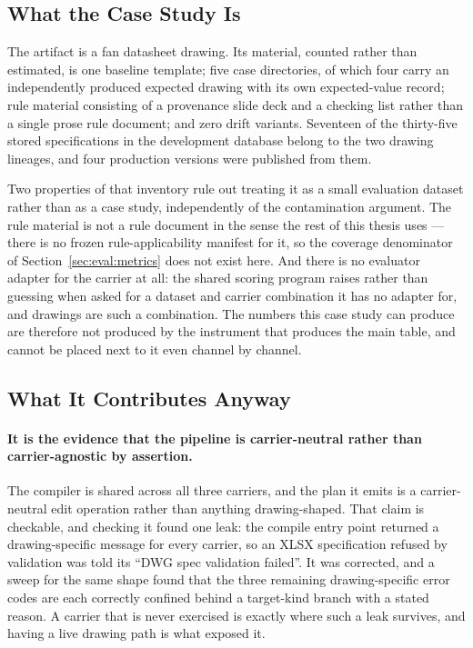 \subsection{What the Case Study Is}

The artifact is a fan datasheet drawing. Its material, counted rather than estimated, is one
baseline template; five case directories, of which four carry an independently produced
expected drawing with its own expected-value record; rule material consisting of a
provenance slide deck and a checking list rather than a single prose rule document; and zero
drift variants. Seventeen of the thirty-five stored specifications in the development database
belong to the two drawing lineages, and four production versions were published from them.

Two properties of that inventory rule out treating it as a small evaluation dataset rather than
as a case study, independently of the contamination argument. The rule material is not a rule
document in the sense the rest of this thesis uses --- there is no frozen rule-applicability
manifest for it, so the coverage denominator of Section~\ref{sec:eval:metrics} does not exist
here. And there is no evaluator adapter for the carrier at all: the shared scoring program
raises rather than guessing when asked for a dataset and carrier combination it has no adapter
for, and drawings are such a combination. The numbers this case study can produce are therefore
not produced by the instrument that produces the main table, and cannot be placed next to it
even channel by channel.

\subsection{What It Contributes Anyway}

\paragraph{It is the evidence that the pipeline is carrier-neutral rather than
carrier-agnostic by assertion.}
The compiler is shared across all three carriers, and the plan it emits is a carrier-neutral
edit operation rather than anything drawing-shaped. That claim is checkable, and checking it
found one leak: the compile entry point returned a drawing-specific message for every carrier,
so an XLSX specification refused by validation was told its ``DWG spec validation failed''.
It was corrected, and a sweep for the same shape found that the three remaining drawing-specific
error codes are each correctly confined behind a target-kind branch with a stated reason. A
carrier that is never exercised is exactly where such a leak survives, and having a live
drawing path is what exposed it.

